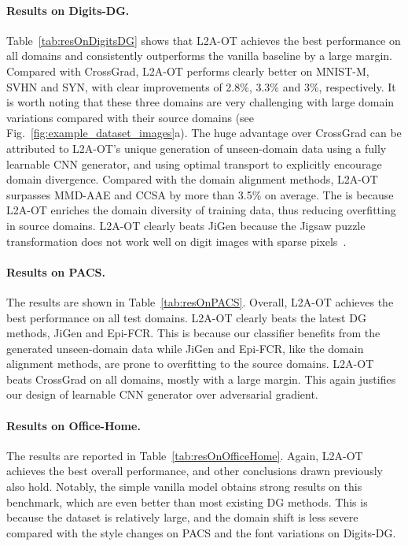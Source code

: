 \documentclass[runningheads]{llncs}
\begin{document}
\paragraph{Results on Digits-DG.}
Table~\ref{tab:resOnDigitsDG} shows that L2A-OT achieves the best performance on all domains and consistently outperforms the vanilla baseline by a large margin. Compared with CrossGrad, L2A-OT performs clearly better on MNIST-M, SVHN and SYN, with clear improvements of 2.8\%, 3.3\% and 3\%, respectively. It is worth noting that these three domains are very challenging with large domain variations compared with their source domains (see Fig.~\ref{fig:example_dataset_images}a). The huge advantage over CrossGrad can be attributed to L2A-OT's unique generation of unseen-domain data using a fully learnable CNN generator, and using optimal transport to explicitly encourage domain divergence. Compared with the domain alignment methods, L2A-OT surpasses MMD-AAE and CCSA by more than 3.5\% on average. The is because L2A-OT enriches the domain diversity of training data, thus reducing overfitting in source domains. L2A-OT clearly beats JiGen because the Jigsaw puzzle transformation does not work well on digit images with sparse pixels~\cite{jigsaw_puzzles}.

\paragraph{Results on PACS.}
The results are shown in Table~\ref{tab:resOnPACS}. Overall, L2A-OT achieves the best performance on all test domains. L2A-OT clearly beats the latest DG methods, JiGen and Epi-FCR. This is because our classifier benefits from the generated unseen-domain data while JiGen and Epi-FCR, like the domain alignment methods, are prone to overfitting to the source domains. L2A-OT beats CrossGrad on all domains, mostly with a large margin. This again justifies our design of learnable CNN generator over adversarial gradient.

\paragraph{Results on Office-Home.}
The results are reported in Table~\ref{tab:resOnOfficeHome}. Again, L2A-OT achieves the best overall performance, and other conclusions drawn previously also hold. Notably, the simple vanilla model obtains strong results on this benchmark, which are even better than most existing DG methods. This is because the dataset is relatively large, and the domain shift is less severe compared with the style changes on PACS and the font variations on Digits-DG.
\end{document}
